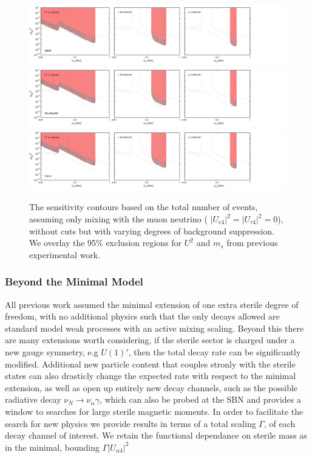 \documentclass[11pt, a4paper]{article}
\begin{document}
\begin{figure}[t]
\center
\includegraphics[width=1.0\textwidth,clip,trim=0 20 300 15]{figures/sbnd_all_panels_um4.pdf}
\includegraphics[width=1.0\textwidth,clip,trim=0 20 300 15]{figures/muboone_all_panels_um4.pdf}
\includegraphics[width=1.0\textwidth,clip,trim=0 20 300 15]{figures/icarus_all_panels_um4.pdf}

\caption{\label{fig:no_cuts_scaled_bkg_um4_only}The sensitivity contours based on the total
number of events, assuming only mixing with the muon neutrino ( $\vert U_{e 4}\vert^2=\vert U_{\tau 4}\vert^2=0$), without cuts but with varying degrees of background
suppression. We overlay the 95\% exclusion regions for $U^2$ and $m_s$ from
previous experimental work.}

\end{figure}


\subsubsection{Beyond the Minimal Model}
All previous work assumed the minimal extension of one extra sterile degree of freedom, with no additional physics such that the only decays allowed are standard model weak processes with an active mixing scaling. Beyond this there are many extensions worth considering, if the sterile sector is charged under a new gauge symmetry, e.g $U(1)'$, then the total decay rate can be significantly modified. Additional new particle content that couples stronly with the sterile states can also drasticly change the expected rate with respect to the minimal extension, as well as open up entirely new decay channels, such as the possible radiative decay $\nu_N \rightarrow \nu_\alpha \gamma$, which can also be probed at the SBN and provides a window to searches for large sterile magnetic moments. In order to facilitate the search for new physics we provide results in terms of a total scaling $\Gamma$, of each decay channel of interest. We retain the functional dependance on sterile mass as in the minimal, bounding $\Gamma \vert U_{\alpha 4}\vert^2$  
\end{document}
